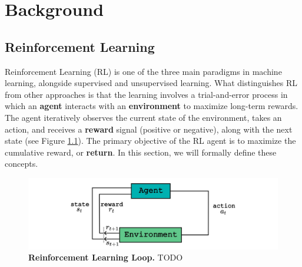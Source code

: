 
\chapter{Background}
\label{sec:background}

\section{Reinforcement Learning}
\label{sec:reinforcement_learning}


Reinforcement Learning (RL) \cite{sutton2018reinforcement} is one of the three main paradigms in machine learning, alongside supervised and unsupervised learning. What distinguishes RL from other approaches is that the learning involves a trial-and-error process in which an \textbf{agent} interacts with an \textbf{environment} to maximize long-term rewards. The agent iteratively observes the current state of the environment, takes an action, and receives a \textbf{reward} signal (positive or negative), along with the next state (see Figure \ref{fig:rl_loop}). The primary objective of the RL agent is to maximize the cumulative reward, or \textbf{return}. In this section, we will formally define these concepts.

\begin{figure}[H]
    \centering
    \includegraphics[width=1\linewidth]{Figures/rl_loop.jpg}
    \caption[Reinforcement Learning Loop]{\textbf{Reinforcement Learning Loop.} TODO}
    \label{fig:rl_loop}
\end{figure}

